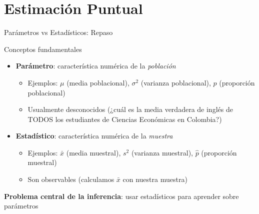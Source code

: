 \documentclass[aspectratio=169, 11pt]{beamer}
\begin{document}
\section{Estimación Puntual}

\begin{frame}{Parámetros vs Estadísticos: Repaso}
\begin{block}{Conceptos fundamentales}
\begin{itemize}
  \item \textbf{Parámetro}: característica numérica de la \emph{población}
  \begin{itemize}
    \item Ejemplos: $\mu$ (media poblacional), $\sigma^2$ (varianza poblacional), $p$ (proporción poblacional)
    \item Usualmente \alert{desconocidos} (¿cuál es la media verdadera de inglés de TODOS los estudiantes de Ciencias Econ\'omicas en Colombia?)
  \end{itemize}
  \item \textbf{Estadístico}: característica numérica de la \emph{muestra}
  \begin{itemize}
    \item Ejemplos: $\bar{x}$ (media muestral), $s^2$ (varianza muestral), $\hat{p}$ (proporción muestral)
    \item Son \alert{observables} (calculamos $\bar{x}$ con nuestra muestra)
  \end{itemize}
\end{itemize}
\end{block}

\vspace{0.3cm}
\textbf{Problema central de la inferencia}: usar estadísticos para aprender sobre parámetros
\end{frame}
\end{document}

